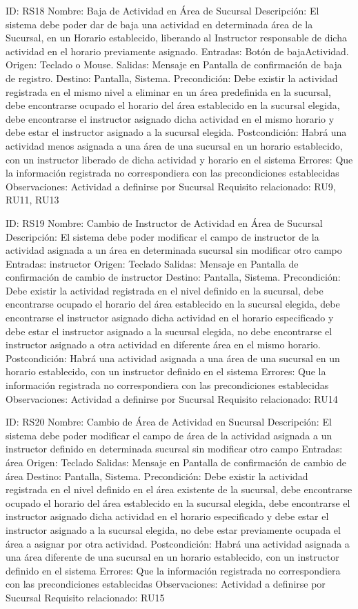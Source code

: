 ID: RS18
Nombre: Baja de Actividad en Área de Sucursal
Descripción: El sistema debe poder dar de baja una actividad en determinada área de la Sucursal, en un Horario establecido, liberando al Instructor responsable de dicha actividad en el horario previamente asignado.
Entradas: Botón de bajaActividad.
Origen: Teclado o Mouse.
Salidas: Mensaje en Pantalla de confirmación de baja de registro. 
Destino: Pantalla, Sistema.
Precondición: Debe existir la actividad registrada en el mismo nivel a eliminar en un área predefinida en la sucursal, debe encontrarse ocupado el horario del área establecido en la sucursal elegida, debe encontrarse el instructor asignado dicha actividad en el mismo horario y debe estar el instructor asignado a la sucursal elegida.
Postcondición: Habrá una actividad menos asignada a una área de una sucursal en un horario establecido, con un instructor liberado de dicha actividad y horario en el sistema
Errores: Que la información registrada no correspondiera con las precondiciones establecidas
Observaciones: Actividad a definirse por Sucursal
Requisito relacionado: RU9, RU11, RU13

ID: RS19
Nombre: Cambio de Instructor de Actividad en Área de Sucursal
Descripción: El sistema debe poder modificar el campo de instructor de la actividad asignada a un área en determinada sucursal sin modificar otro campo
Entradas: instructor
Origen: Teclado
Salidas: Mensaje en Pantalla de confirmación de cambio de instructor
Destino: Pantalla, Sistema.
Precondición: Debe existir la actividad registrada en el nivel definido en la sucursal, debe encontrarse ocupado el horario del área establecido en la sucursal elegida, debe encontrarse el instructor asignado dicha actividad en el horario especificado y debe estar el instructor asignado a la sucursal elegida, no debe encontrarse el instructor asignado a otra actividad en diferente área en el mismo horario.
Postcondición: Habrá una actividad asignada a una área de una sucursal en un horario establecido, con un instructor definido en el sistema
Errores: Que la información registrada no correspondiera con las precondiciones establecidas
Observaciones: Actividad a definirse por Sucursal
Requisito relacionado: RU14
 
ID: RS20
Nombre: Cambio de Área de Actividad en Sucursal
Descripción: El sistema debe poder modificar el campo de área de la actividad asignada a un instructor definido en determinada sucursal sin modificar otro campo
Entradas: área
Origen: Teclado
Salidas: Mensaje en Pantalla de confirmación de cambio de área
Destino: Pantalla, Sistema.
Precondición: Debe existir la actividad registrada en el nivel definido en el área existente de la sucursal, debe encontrarse ocupado el horario del área establecido en la sucursal elegida, debe encontrarse el instructor asignado dicha actividad en el horario especificado y debe estar el instructor asignado a la sucursal elegida, no debe estar previamente ocupada el área a asignar por otra actividad.
Postcondición: Habrá una actividad asignada a una área diferente de una sucursal en un horario establecido, con un instructor definido en el sistema
Errores: Que la información registrada no correspondiera con las precondiciones establecidas
Observaciones: Actividad a definirse por Sucursal
Requisito relacionado: RU15
